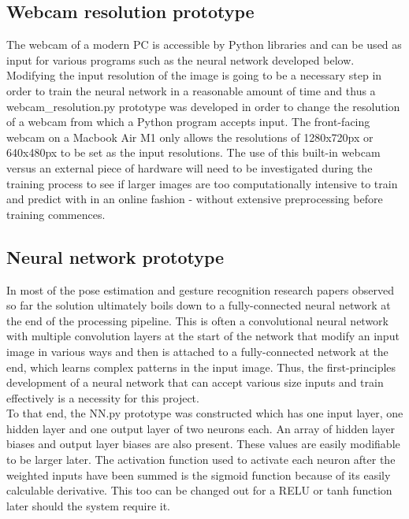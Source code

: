 \subsection{Webcam resolution prototype}

The webcam of a modern PC is accessible by Python libraries and can be used as input for various programs such as the neural network developed below. Modifying the input resolution of the image is going to be a necessary step in order to train the neural network in a reasonable amount of time and thus a webcam\_resolution.py prototype was developed in order to change the resolution of a webcam from which a Python program accepts input. The front-facing webcam on a Macbook Air M1 only allows the resolutions of 1280x720px or 640x480px to be set as the input resolutions. The use of this built-in webcam versus an external piece of hardware will need to be investigated during the training process to see if larger images are too computationally intensive to train and predict with in an online fashion - without extensive preprocessing before training commences.

\subsection{Neural network prototype}

In most of the pose estimation \cite{deep_pose} and gesture recognition research papers \cite{mediapipe_hands} observed so far the solution ultimately boils down to a fully-connected neural network at the end of the processing pipeline. This is often a convolutional neural network with multiple convolution layers at the start of the network that modify an input image in various ways and then is attached to a fully-connected network at the end, which learns complex patterns in the input image. Thus, the first-principles development of a neural network that can accept various size inputs and train effectively is a necessity for this project. \\

To that end, the NN.py prototype was constructed which has one input layer, one hidden layer and one output layer of two neurons each. An array of hidden layer biases and output layer biases are also present. These values are easily modifiable to be larger later. The activation function used to activate each neuron after the weighted inputs have been summed is the sigmoid function because of its easily calculable derivative. This too can be changed out for a RELU or tanh function later should the system require it.\\

